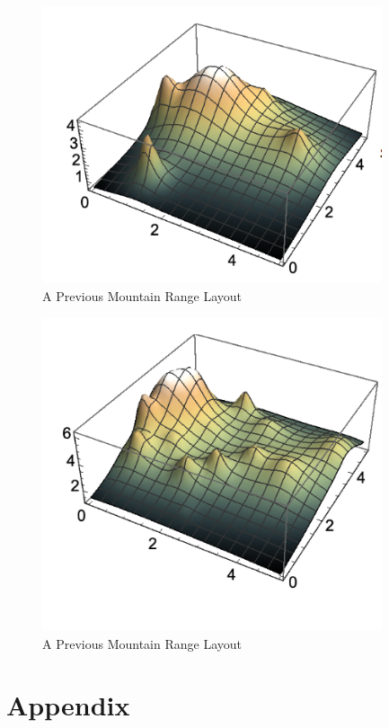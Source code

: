 \documentclass[12pt]{article}   %
\theoremstyle{definition}
\numberwithin{equation}{section}
\begin{document}
\begin{figure} [h]
  \centering
  \includegraphics[width=10cm]{../images/mtn2.png}
  \caption{A Previous Mountain Range Layout}
\end{figure}

\begin{figure} [h]
  \centering
  \includegraphics[width=10cm]{../images/mtn3.png}
  \caption{A Previous Mountain Range Layout}
\end{figure}
\section{Appendix} \label{APPM2350proj02sec08}


\end{document}

